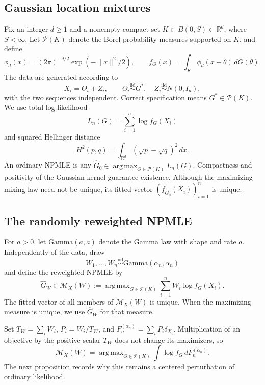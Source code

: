 \documentclass[11pt]{article}
\theoremstyle{definition}
\theoremstyle{remark}
\DeclareMathOperator*{\argmax}{arg\,max}
\newcommand{\Pcal}{\mathcal P}
\newcommand{\Mcal}{\mathcal M}
\newcommand{\RR}{\mathbb R}
\newcommand{\norm}[1]{\lVert #1\rVert}
\newcommand{\Ghat}{\widehat G}
\begin{document}
\subsection{Gaussian location mixtures}

Fix an integer $d\ge1$ and a nonempty compact set
$K\subset B(0,S)\subset\RR^d$, where $S<\infty$.  Let $\Pcal(K)$ denote the
Borel probability measures supported on $K$, and define
\[
 \phi_d(x)=(2\pi)^{-d/2}\exp(-\norm{x}^2/2),
 \qquad f_G(x)=\int_K\phi_d(x-\theta)\,dG(\theta).
\]
The data are generated according to
\begin{equation}\label{eq:model}
 X_i=\Theta_i+Z_i,\qquad
 \Theta_i\stackrel{\mathrm{iid}}\sim G^*,\quad
 Z_i\stackrel{\mathrm{iid}}\sim N(0,I_d),
\end{equation}
with the two sequences independent.  Correct specification means
$G^*\in\Pcal(K)$.  We use total log-likelihood
\[
 L_n(G)=\sum_{i=1}^n\log f_G(X_i)
\]
and squared Hellinger distance
\[
 H^2(p,q)=\int_{\RR^d}(\sqrt p-\sqrt q)^2\,dx.
\]
An ordinary NPMLE is any $\Ghat_0\in\argmax_{G\in\Pcal(K)}L_n(G)$.
Compactness and positivity of the Gaussian kernel guarantee existence.
Although the maximizing mixing law need not be unique, its fitted vector
$(f_{\Ghat_0}(X_i))_{i=1}^n$ is unique.

\subsection{The randomly reweighted NPMLE}

For $a>0$, let $\mathrm{Gamma}(a,a)$ denote the Gamma law with shape and
rate $a$.  Independently of the data, draw
\begin{equation}\label{eq:weights}
 W_1,\ldots,W_n\stackrel{\mathrm{iid}}\sim\mathrm{Gamma}(\alpha_n,\alpha_n)
\end{equation}
and define the reweighted NPMLE by
\begin{equation}\label{eq:rrnpmle}
 \Ghat_W\in\Mcal_X(W):=
 \argmax_{G\in\Pcal(K)}\sum_{i=1}^nW_i\log f_G(X_i).
\end{equation}
The fitted vector of all members of $\Mcal_X(W)$ is unique.  When the
maximizing measure is unique, we use $\Ghat_W$ for that measure.

Set $T_W=\sum_iW_i$, $P_i=W_i/T_W$, and
$F_n^{(\alpha_n)}=\sum_iP_i\delta_{X_i}$.  Multiplication of an objective by
the positive scalar $T_W$ does not change its maximizers, so
\[
 \Mcal_X(W)=\argmax_{G\in\Pcal(K)}
 \int\log f_G\,dF_n^{(\alpha_n)}.
\]
The next proposition records why this remains a centered perturbation of
ordinary likelihood.
\end{document}
